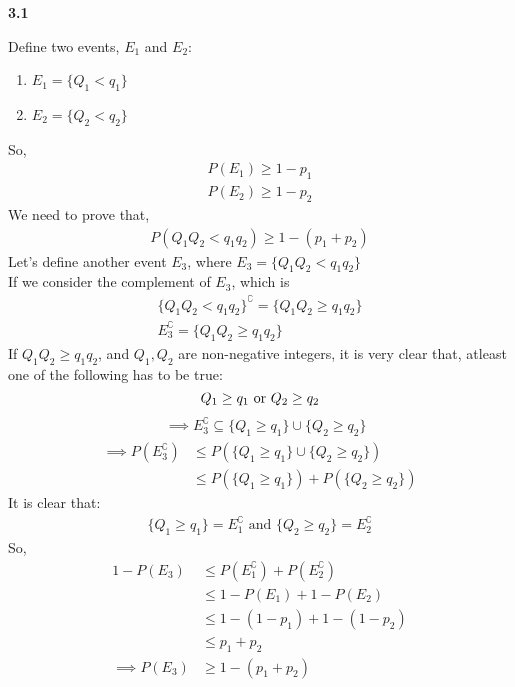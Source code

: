 \begin{tcolorbox}[breakable]
	\begin{sol}

		\textbf{3.1}

		Define two events, $E_1$ and $E_2$:
		\begin{enumerate}
			\item $E_1=\{Q_1<q_1\}$
			\item $E_2=\{Q_2<q_2\}$
		\end{enumerate}
		So,
		\begin{align*}
			P(E_1)\geq 1-p_1 \\
			P(E_2)\geq 1-p_2
		\end{align*}
		We need to prove that,
		\begin{align*}
			P(Q_1Q_2 < q_1q_2) \geq 1 - (p_1 + p_2)
		\end{align*}
		Let's define another event $E_3$, where $E_3=\{Q_1Q_2 < q_1q_2\}$\\
		If we consider the complement of $E_3$, which is
		\begin{align*}
			\{Q_1Q_2 < q_1q_2\}^\complement=\{Q_1Q_2 \geq q_1q_2\} \\
			E_3^\complement=\{Q_1Q_2 \geq q_1q_2\}
		\end{align*}
		If $Q_1Q_2 \geq q_1q_2$, and $Q_1,Q_2$ are non-negative integers, it is very clear that, atleast one of the following has to be true:
		\begin{equation*}
			Q_1\geq q_1 \text{ or }Q_2\geq q_2 \\
		\end{equation*}
		\begin{align*}
			 & \implies E_3^\complement \subseteq \{Q_1\geq q_1\}\cup\{Q_2\geq q_2\}
		\end{align*}
		\begin{align*}
			\implies P(E_3^\complement) & \leq P\left(\{Q_1\geq q_1\}\cup\{Q_2\geq q_2\} \right) \\
			                            & \leq P(\{Q_1\geq q_1\})+P(\{Q_2\geq q_2\} )
		\end{align*}
		It is clear that:
		\begin{align*}
			\{Q_1\geq q_1\} = E_1^\complement \text{ and } \{Q_2\geq q_2\} = E_2^\complement
		\end{align*}
		So,
		\begin{align*}
			1-P(E_3)        & \leq P(E_1^\complement) + P(E_2^\complement) \\
			                & \leq 1-P(E_1) + 1-P(E_2)                     \\
			                & \leq 1-(1-p_1) + 1-(1-p_2)                   \\
			                & \leq p_1 +p_2                                \\
			\implies P(E_3) & \geq 1-(p_1+p_2)
		\end{align*}



\end{sol}
\end{tcolorbox}
